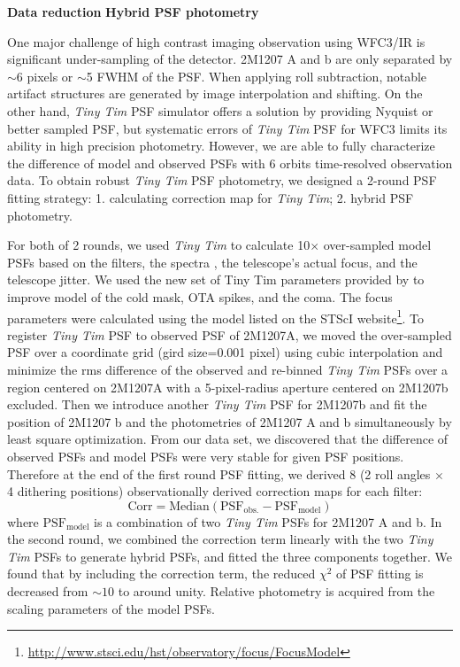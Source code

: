 \documentclass[12pt]{article}
\newcommand{\tinytim}{\textit{Tiny Tim}}
\begin{document}
\textbf{Data reduction}
\textbf{Hybrid PSF photometry}

One major challenge of high contrast imaging observation using WFC3/IR
is significant under-sampling of the detector.  2M1207 A and b are
only separated by $\sim6$ pixels or $\sim$5 FWHM of the PSF. When
applying roll subtraction, notable artifact structures are generated
by image interpolation and shifting. On the other hand, \tinytim{} PSF
simulator\cite{Krist1995} offers a solution by providing Nyquist or better
sampled PSF, but systematic errors of \tinytim{} PSF for WFC3 limits
its ability in high precision photometry\cite{Biretta2014}. However,
we are able to fully characterize the difference of model and observed
PSFs with 6 orbits time-resolved observation data. To obtain robust \tinytim{} PSF
photometry, we designed a 2-round PSF fitting strategy: 1. calculating
correction map for \tinytim{}; 2. hybrid PSF photometry.

For both of 2 rounds, we used {\em Tiny Tim} to calculate 10$\times$
over-sampled model PSFs based on the filters, the spectra 
\cite{Bonnefoy2014, Patience2010}, the telescope's actual focus, and
the telescope jitter.  We used the new set of Tiny Tim parameters
provided by \cite{Biretta2014} to improve model of the cold mask,
OTA spikes, and the coma. The focus parameters were calculated
using the model listed on the STScI
website\footnote{\url{http://www.stsci.edu/hst/observatory/focus/FocusModel}}. To
register \tinytim{} PSF to observed PSF of 2M1207A, we moved the
over-sampled PSF over a coordinate grid (gird size=0.001 pixel) using
cubic interpolation and minimize the rms difference of the
observed and re-binned \tinytim{} PSFs over a region centered on 2M1207A with a
5-pixel-radius aperture centered on 2M1207b excluded. Then we introduce
another \tinytim{} PSF for 2M1207b and  fit the
position of 2M1207 b and the photometries of 2M1207 A and b simultaneously
by least square optimization. From our data set, we discovered that
the difference of observed PSFs and model PSFs were very stable for
given PSF positions. Therefore at the end of the first round PSF
fitting, we derived 8 (2 roll angles $\times$ 4 dithering positions)
observationally derived correction maps for each filter:
\begin{equation}
  \mathrm{Corr = Median(PSF_{obs.} - PSF_{model} )}
\end{equation}
where $\mathrm{PSF_{model}}$ is a combination of two \tinytim{} PSFs
for 2M1207 A and b. In the second round, we combined the correction
term linearly with the two \tinytim{} PSFs to generate hybrid PSFs,
and fitted the three components together. We found that by including the correction term,
the reduced $\chi^{2}$ of PSF fitting is decreased from $\sim 10$ to
around unity. Relative photometry is acquired from the scaling
parameters of the model PSFs.
\end{document}
